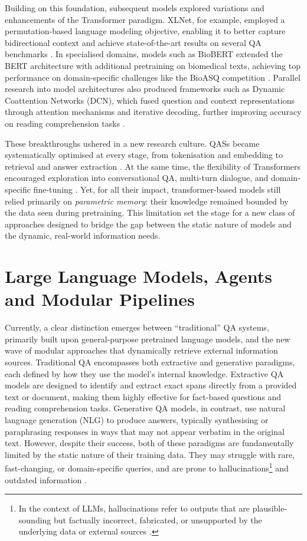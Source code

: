 \begin{spacing}{1.5}
Building on this foundation, subsequent models explored variations and enhancements of the Transformer paradigm. XLNet, for example, employed a permutation-based language modeling objective, enabling it to better capture bidirectional context and achieve state-of-the-art results on several QA benchmarks \citep{yang_xlnet_2020}. In specialised domains, models such as BioBERT extended the BERT architecture with additional pretraining on biomedical texts, achieving top performance on domain-specific challenges like the BioASQ competition \citep{yoon_pre-trained_2019}. Parallel research into model architectures also produced frameworks such as Dynamic Coattention Networks (DCN), which fused question and context representations through attention mechanisms and iterative decoding, further improving accuracy on reading comprehension tasks \citep{xiong_dynamic_2018}.

These breakthroughs ushered in a new research culture. QASs became systematically optimised at every stage, from tokenisation and embedding to retrieval and answer extraction \citep{farea_understanding_2025}. At the same time, the flexibility of Transformers encouraged exploration into conversational QA, multi-turn dialogue, and domain-specific fine-tuning \citep{yue_survey_2025}. Yet, for all their impact, transformer-based models still relied primarily on \textit{parametric memory}: their knowledge remained bounded by the data seen during pretraining. This limitation set the stage for a new class of approaches designed to bridge the gap between the static nature of models and the dynamic, real-world information needs.

\section{Large Language Models, Agents and Modular Pipelines}\label{sec:llm-agents}
Currently, a clear distinction emerges between ``traditional'' QA systems, primarily built upon general-purpose pretrained language models, and the new wave of modular approaches that dynamically retrieve external information sources. Traditional QA encompasses both extractive and generative paradigms, each defined by how they use the model’s internal knowledge. Extractive QA models are designed to identify and extract exact spans directly from a provided text or document, making them highly effective for fact-based questions and reading comprehension tasks. Generative QA models, in contrast, use natural language generation (NLG) to produce answers, typically synthesising or paraphrasing responses in ways that may not appear verbatim in the original text. However, despite their success, both of these paradigms are fundamentally limited by the static nature of their training data. They may struggle with rare, fast-changing, or domain-specific queries, and are prone to hallucinations\footnote{In the context of LLMs, hallucinations refer to outputs that are plausible-sounding but factually incorrect, fabricated, or unsupported by the underlying data or external sources \citep{harsh_comprehending_2024}.} and outdated information \citep{farea_understanding_2025}.


\end{spacing}
